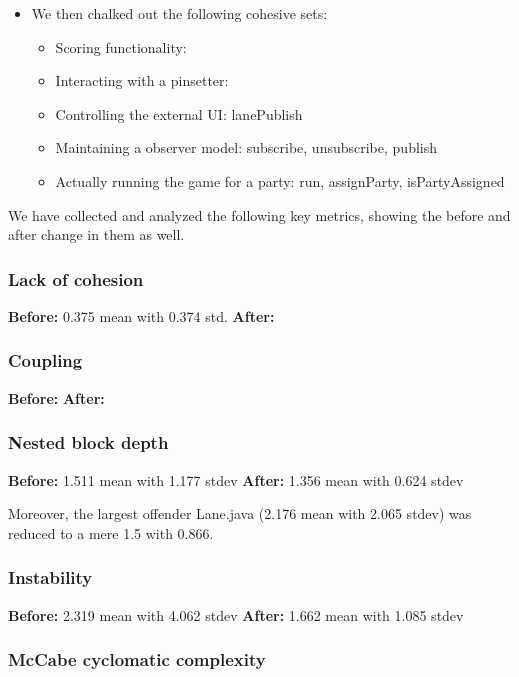 \begin{itemize}
    \item We then chalked out the following cohesive sets:
          \begin{itemize}
              \item Scoring functionality: 
              \item Interacting with a pinsetter: 
              \item Controlling the external UI: lanePublish
              \item Maintaining a observer model: subscribe, unsubscribe, publish
              \item Actually running the game for a party: run, assignParty, isPartyAssigned
          \end{itemize}

\end{itemize}
We have collected and analyzed the following key metrics, showing the before and after change in them as well.

\subsubsection{Lack of cohesion}

\textbf{Before:} 0.375 mean with 0.374 std.
\textbf{After:}

\subsubsection{Coupling}
\textbf{Before:}
\textbf{After:}

\subsubsection{Nested block depth}
\textbf{Before:} 1.511 mean with 1.177 stdev
\textbf{After:} 1.356 mean with 0.624 stdev

Moreover, the largest offender Lane.java (2.176 mean with 2.065 stdev) was reduced to a mere 1.5 with 0.866.

\subsubsection{Instability}

\textbf{Before:} 2.319 mean with 4.062 stdev
\textbf{After:} 1.662 mean with 1.085 stdev


\subsubsection{McCabe cyclomatic complexity}

